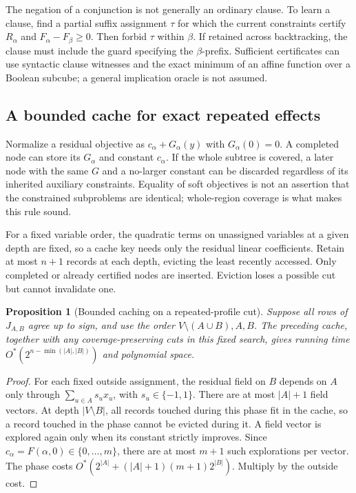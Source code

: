 \documentclass[11pt,a4paper]{article}
\newtheorem{proposition}[theorem]{Proposition}
\theoremstyle{definition}
\theoremstyle{remark}
\newcommand{\Ostar}{O^{*}}
\begin{document}
The negation of a conjunction is not generally an ordinary clause.
To learn a clause, find a partial suffix assignment $\tau$ for which the
current constraints certify $R_\alpha$ and $F_\alpha-F_\beta\ge0$.
Then forbid $\tau$ within $\beta$. If retained across backtracking, the
clause must include the guard specifying the $\beta$-prefix. Sufficient
certificates can use syntactic clause witnesses and the exact minimum of
an affine function over a Boolean subcube; a general implication oracle
is not assumed.

\subsection{A bounded cache for exact repeated effects}

Normalize a residual objective as $c_\alpha+G_\alpha(y)$ with
$G_\alpha(0)=0$. A completed node can store its $G_\alpha$ and constant
$c_\alpha$. If the whole subtree is covered, a later node with the same
$G$ and a no-larger constant can be discarded regardless of its inherited
auxiliary constraints. Equality of soft objectives is not an assertion
that the constrained subproblems are identical; whole-region coverage is
what makes this rule sound.

For a fixed variable order, the quadratic terms on unassigned variables at a given depth are
fixed, so a cache key needs only the residual linear coefficients. Retain
at most $n+1$ records at each depth, evicting the least recently accessed.
Only completed or already certified nodes are inserted. Eviction loses a
possible cut but cannot invalidate one.

\begin{proposition}[Bounded caching on a repeated-profile cut]
Suppose all rows of $J_{A,B}$ agree up to sign, and use the order
$V\setminus(A\cup B),A,B$. The preceding cache, together with any
coverage-preserving cuts in this fixed search, gives running time
$\Ostar(2^{n-\min(|A|,|B|)})$ and polynomial space.
\end{proposition}
\begin{proof}
For each fixed outside assignment, the residual field on $B$ depends on
$A$ only through $\sum_{u\in A}s_ux_u$, with $s_u\in\{-1,1\}$.
There are at most $|A|+1$ field vectors. At depth $|V\setminus B|$, all
records touched during this phase fit in the cache, so a record touched
in the phase cannot be evicted during it. A field vector is explored again
only when its constant strictly improves. Since
$c_\alpha=F(\alpha,0)\in\{0,\ldots,m\}$, there are at most $m+1$ such
explorations per vector. The phase costs
$\Ostar(2^{|A|}+(|A|+1)(m+1)2^{|B|})$. Multiply by the outside cost.
\end{proof}
\end{document}

